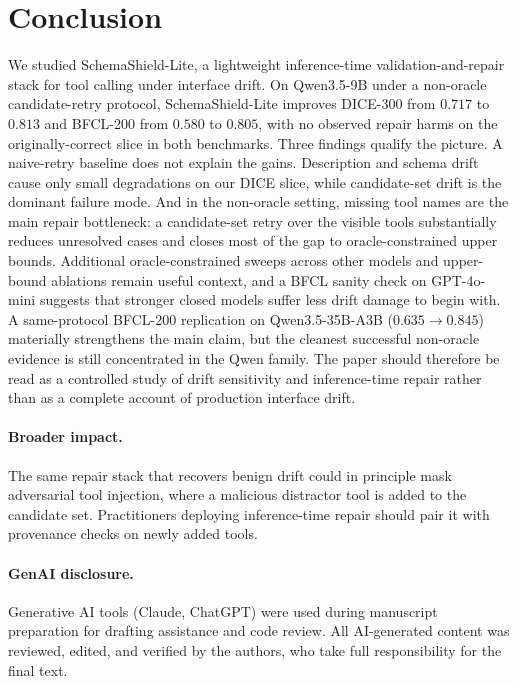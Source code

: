 \documentclass[runningheads]{llncs}
\newcommand{\method}{SchemaShield-Lite\xspace}
\begin{document}
\section{Conclusion}
We studied \method, a lightweight inference-time validation-and-repair stack for
tool calling under interface drift. On Qwen3.5-9B under a non-oracle candidate-retry protocol,
\method improves DICE-300 from $0.717$ to $0.813$ and BFCL-200 from $0.580$ to
$0.805$, with no observed repair harms on the originally-correct slice in both
benchmarks. Three findings qualify the picture. A naive-retry baseline does not
explain the gains. Description and schema drift cause only small degradations on
our DICE slice, while candidate-set drift is the dominant failure mode. And in the
non-oracle setting, missing tool names are the main repair bottleneck: a
candidate-set retry over the visible tools substantially reduces unresolved cases
and closes most of the gap to oracle-constrained upper bounds. Additional
oracle-constrained sweeps across other models and upper-bound ablations remain
useful context, and a BFCL sanity check on GPT-4o-mini suggests that stronger
closed models suffer less drift damage to begin with. A same-protocol BFCL-200
replication on Qwen3.5-35B-A3B ($0.635 \rightarrow 0.845$) materially strengthens
the main claim, but the cleanest successful non-oracle evidence is still
concentrated in the Qwen family. The paper should therefore be read as a
controlled study of drift sensitivity and inference-time repair rather than as a
complete account of production interface drift.

\paragraph{Broader impact.}
The same repair stack that recovers benign drift could in principle mask adversarial
tool injection, where a malicious distractor tool is added to the candidate set.
Practitioners deploying inference-time repair should pair it with provenance checks
on newly added tools.

\paragraph{GenAI disclosure.}
Generative AI tools (Claude, ChatGPT) were used during manuscript preparation for
drafting assistance and code review. All AI-generated content was reviewed, edited,
and verified by the authors, who take full responsibility for the final text.



\end{document}
